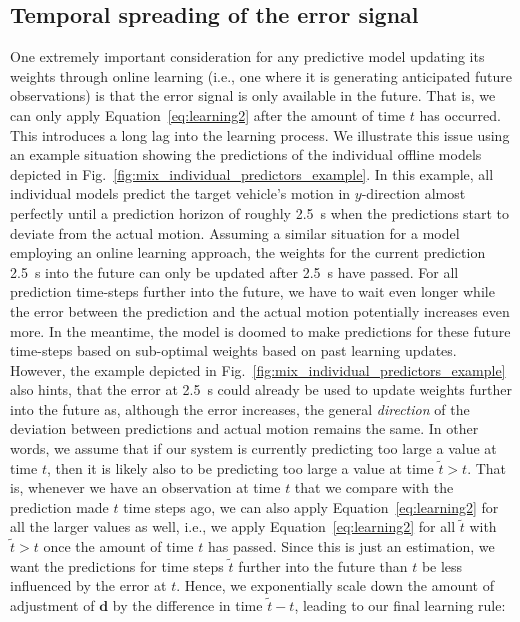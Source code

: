\subsection{Temporal spreading of the error signal}%
\label{subsec:temporal_spreading_of_the_error_signal}

One extremely important consideration for any predictive model updating its weights through online learning (i.e., one where it is generating anticipated future observations) is that the error signal is only available in the future.
That is, we can only apply Equation~\eqref{eq:learning2} after the amount of time $t$ has occurred.  
This introduces a long lag into the learning process.  
We illustrate this issue using an example situation showing the predictions of the individual offline models depicted in Fig.~\ref{fig:mix_individual_predictors_example}.
In this example, all individual models predict the target vehicle's motion in $y$-direction almost perfectly until a prediction horizon of roughly \SI{2.5}{\second} when the predictions start to deviate from the actual motion.
Assuming a similar situation for a model employing an online learning approach, the weights for the current prediction \SI{2.5}{\second} into the future can only be updated after \SI{2.5}{\second} have passed. 
For all prediction time-steps further into the future, we have to wait even longer while the error between the prediction and the actual motion potentially increases even more.
In the meantime, the model is doomed to make predictions for these future time-steps based on sub-optimal weights based on past learning updates.
However, the example depicted in Fig.~\ref{fig:mix_individual_predictors_example} also hints, that the error at \SI{2.5}{\second} could already be used to update weights further into the future as, although the error increases, the general \emph{direction} of the deviation between predictions and actual motion remains the same. 
In other words, we assume that if our system is currently predicting too large a value at time $t$, then it is likely also to be predicting too large a value at time $ \tilde{t} > t$.
That is, whenever we have an observation at time $t$ that we compare with the prediction made $t$ time steps ago, we can also apply Equation~\eqref{eq:learning2} for all the larger values as well, i.e., we apply Equation~\eqref{eq:learning2} for all $ \tilde{t}$ with $ \tilde{t} > t$ once the amount of time $t$ has passed.
Since this is just an estimation, we want the predictions for time steps $ \tilde{t} $ further into the future than $t$ be less influenced by the error at $t$.
Hence, we exponentially scale down the amount of adjustment of $\mathbf{d}$ by the difference in time $ \tilde{t}-t$, leading to our final learning rule:


